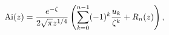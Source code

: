 \[\mathop{\mathrm{Ai}\/}\nolimits\!\left(z\right)=\frac{e^{-\zeta}}{2\sqrt{\pi}z%
^{1/4}}\left(\sum_{k=0}^{n-1}(-1)^{k}\frac{u_{k}}{\zeta^{k}}+R_{n}(z)\right),\]